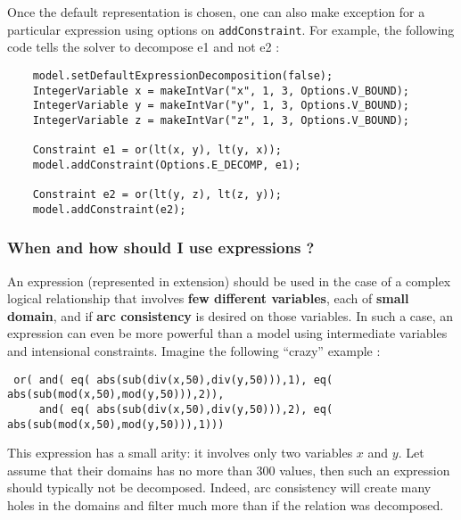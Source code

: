 Once the default representation is chosen, one can also make exception for a particular expression using options on \texttt{addConstraint}. 
For example, the following code tells the solver to decompose e1 and not e2 :
\begin{lstlisting}
	model.setDefaultExpressionDecomposition(false);
	IntegerVariable x = makeIntVar("x", 1, 3, Options.V_BOUND);
	IntegerVariable y = makeIntVar("y", 1, 3, Options.V_BOUND);
	IntegerVariable z = makeIntVar("z", 1, 3, Options.V_BOUND);

	Constraint e1 = or(lt(x, y), lt(y, x));
	model.addConstraint(Options.E_DECOMP, e1);
	
	Constraint e2 = or(lt(y, z), lt(z, y));
	model.addConstraint(e2);
\end{lstlisting}

\subsubsection{When and how should I use expressions ?}\label{model:whenshouldiuseexpressions}\hypertarget{model:whenshouldiuseexpressions}{}
An expression (represented in extension) should be used in the case of a complex logical relationship that involves \textbf{few different variables}, each of \textbf{small domain}, and if \textbf{arc consistency} is desired on those variables.
In such a case, an expression can even be more powerful than a model using intermediate variables and intensional constraints.
Imagine the following ``crazy'' example :
\begin{lstlisting}
 or( and( eq( abs(sub(div(x,50),div(y,50))),1), eq( abs(sub(mod(x,50),mod(y,50))),2)),
     and( eq( abs(sub(div(x,50),div(y,50))),2), eq( abs(sub(mod(x,50),mod(y,50))),1)))
\end{lstlisting}
This expression has a small arity: it involves only two variables $x$ and $y$.
Let assume that their domains has no more than 300 values, then such an expression should typically not be decomposed. Indeed, arc consistency will create many holes in the domains and filter much more than if the relation was decomposed.

